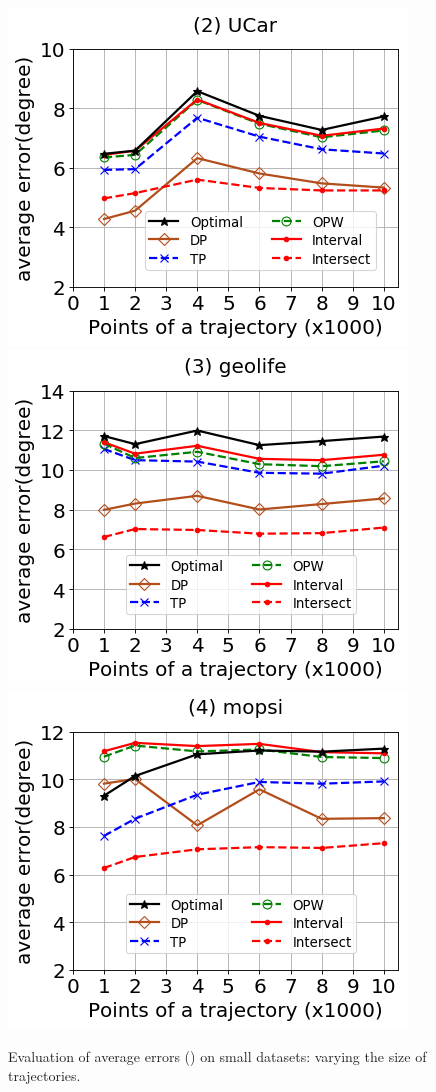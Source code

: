 \begin{figure}[tb!]
	\centering
	\includegraphics[scale=0.320]{Figures/Exp-DAD-error-size-service.png}	\hspace{3ex}
	\includegraphics[scale=0.320]{Figures/Exp-DAD-error-size-geolife.png}	\hspace{3ex}
	\includegraphics[scale=0.320]{Figures/Exp-DAD-error-size-mopsi.png}	
	\vspace{-2ex}
	\caption{\small Evaluation of average errors (\dad) on small datasets: varying the size of trajectories.}
	\label{fig:ae-dad-size}
	\vspace{-2ex}
\end{figure}


